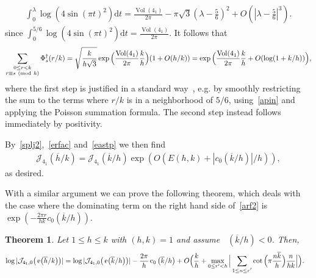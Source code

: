 \documentclass[11pt]{amsart}
\newcommand{\J}{\mathcal{J}}
\renewcommand{\mod}[1]{~\pr{\textnormal{mod}~#1}}
\newtheorem{theo}{Theorem}
\theoremstyle{definition}
\newcommand{\ssum}[1]{\sum_{\substack{#1}}}
\newcommand{\pr}[1]{\mathchoice{\left( #1\right)}{(#1)}{(#1)}{(#1)}}
\newcommand{\e}[1][]{\ifthenelse{\equal{#1}{}}{{\rm e}}{\operatorname{e}\pr{ #1}}}
\newcommand{\df}{\mathrm{d}}
\DeclareMathOperator{\Vol}{Vol}
\DeclareMathOperator{\cz}{c_0}
\newcommand{\1}{{\mathbf 1}}
\renewcommand{\bar}[1]{\overline{#1}}
\let\originalleft\left
\let\originalright\right
\renewcommand{\left}{\mathopen{}\mathclose\bgroup\originalleft}
\renewcommand{\right}{\aftergroup\egroup\originalright}
\numberwithin{equation}{section}
\begin{document}
\begin{align}\label{apin}
  \int_0^\lambda\log(4\sin(\pi t)^2)\df t=\frac{\Vol (4_1)}{2\pi}-\pi\sqrt 3(\lambda-\tfrac56)^2+O(|\lambda-\tfrac56|^3).
\end{align}
since $\int_0^{5/6}\log(4\sin(\pi t)^2)\df t=\frac{\Vol (4_1)}{2\pi}$.
It follows that 
\begin{align}\label{eastp}
  \ssum{0\leq r<k\\ r\equiv s \mod{h}} \Phi_s^\dagger(r/k)=\sqrt{\frac{k}{h\sqrt 3}}\exp\Big(\frac{\Vol (4_1)}{2\pi}\frac kh\Big)(1+O(h/k))=\exp\Big(\frac{\Vol (4_1)}{2\pi}\frac kh+O(\log (1+k/h))\Big),
\end{align}
where the first step is justified in a standard way~\cite[p.517]{FlajoletSedgewick2009}, e.g. by smoothly restricting the sum to the terms where $r/k$ is in a neighborhood of $5/6$, using~\eqref{apin} and applying the Poisson summation formula. The second step instead follows immediately by positivity.

By~\eqref{splj2},~\eqref{erfac} and~\eqref{eastp} we then find
\begin{align}\label{exts}
  \J_{4_1}(\bar h/k)=  \J_{4_1}(\bar k/h)\exp(O(E(h,k)+|c_0({\overline k}/h)|/h)),
\end{align}
as desired.

With a similar argument we can prove the following theorem, which deals with the case where the dominating term on the right hand side of~\eqref{arf2} is $\exp(- \frac {2\pi r}{hk}c_0({\overline k}/h))$.

\begin{theo}\label{th:4}
  Let $1\leq h\leq k$ with $(h,k)=1$ and assume $\cz({\overline k}/h)<0$. Then,
  \begin{equation}\label{eq:srf}
    \begin{split}
      \log |\J_{4_1,0}\big(\e[{\overline{h}}/k]\big)|&=\log |\J_{4_1,0}\big(\e[{\overline k}/h]\big)|- \frac{2\pi}{h} \cz\big({\overline k}/h\big)+O\Big(\frac k h+\max_{0\leq r' < h}\Big|\ssum{1\leq n\leq r'}\cot\Big(\pi\frac{n\overline k }h\Big)\frac{ n}{hk}\Big|\Big).
    \end{split}
  \end{equation}
\end{theo}
\end{document}
